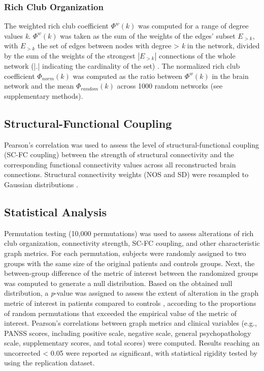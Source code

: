 \begin{refsection}
\subsubsection*{Rich Club Organization}
The weighted rich club coefficient ${\Phi}^{w}(k)$ was computed for a range of degree values \textit{k}. ${\Phi}^{w}(k)$ was taken as the sum of the weights of the edges’ subset $E_{>k}$, with $E_{>k}$ the set of edges between nodes with degree > \textit{k} in the network, divided by the sum of the weights of the strongest $|E_{>k}|$ connections of the whole network (|.| indicating the cardinality of the set) \citep{vanDenHeuvel2011RichclubOO,Opsahl2008ProminenceAC}. The normalized rich club coefficient ${\Phi}_{norm}(k)$ was computed as the ratio between ${\Phi}^{w}(k)$ in the brain network and the mean ${\Phi}_{random}(k)$ across 1000 random networks (see supplementary methods).

\subsection*{Structural-Functional Coupling}
Pearson’s correlation was used to assess the level of structural-functional coupling (SC-FC coupling) between the strength of structural connectivity and the corresponding functional connectivity values across all reconstructed brain connections. Structural connectivity weights (NOS and SD) were resampled to Gaussian distributions \citep{Hagmann2008MappingTS}.

\subsection*{Statistical Analysis}
Permutation testing (10,000 permutations) was used to assess alterations of rich club organization, connectivity strength, SC-FC coupling, and other characteristic graph metrics. For each permutation, subjects were randomly assigned to two groups with the same size of the original patients and controls groups. Next, the between-group difference of the metric of interest between the randomized groups was computed to generate a null distribution. Based on the obtained null distribution, a \textit{p}-value was assigned to assess the extent of alteration in the graph metric of interest in patients compared to controls \citep{vanDenHeuvel2013AbnormalRC}, according to the proportions of random permutations that exceeded the empirical value of the metric of interest. Pearson’s correlations between graph metrics and clinical variables (e.g., PANSS scores, including positive scale, negative scale, general psychopathology scale, supplementary scores, and total scores) were computed. Results reaching an uncorrected \pval < 0.05 were reported as significant, with statistical rigidity tested by using the replication dataset.


\end{refsection}
